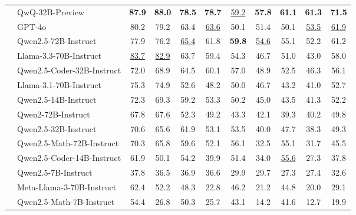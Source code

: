 \begin{table*}[h]
{\begin{tabular}{clccccccccc}
\hline

& QwQ-32B-Preview & \textbf{87.9} & \textbf{88.0} & \textbf{78.5} & \textbf{78.7} & \underline{59.2} & \textbf{57.8} &\textbf{61.1} & \textbf{61.3} & \textbf{71.5} \\
 & GPT-4o& 80.2 & 79.2& 63.4 &\underline{63.6} & 50.1&51.4& 50.1 & \underline{53.5} & \underline{61.9} \\
 & Qwen2.5-72B-Instruct & 77.9 & 76.2 & \underline{65.4} & 61.8 & \textbf{59.8} & \underline{54.6} & 55.1 & 52.2 &  61.2 \\

 & Llama-3.3-70B-Instruct & \underline{83.7} & \underline{82.9} & 63.7 & 59.4 & 54.3 & 46.7 & 51.0 & 43.0 & 58.0 \\
 & Qwen2.5-Coder-32B-Instruct & 72.0 & 68.9 & 64.5 & 60.1 & 57.0 & 48.9 & 52.5 & 46.3 & 56.1 \\
 & Llama-3.1-70B-Instruct & 75.3 & 74.9 & 52.6 & 48.2 & 50.0 & 46.7 & 43.2 & 41.0 & 52.7 \\
 & Qwen2.5-14B-Instruct & 72.3 & 69.3 & 59.2 & 53.3 & 50.2 & 45.0 & 43.5 & 41.3 & 52.2 \\
 & Qwen2-72B-Instruct & 67.8 & 67.6 & 52.3 & 49.2 & 43.3 & 42.1 & 39.3 & 40.2 & 49.8 \\
 & Qwen2.5-32B-Instruct & 70.6 & 65.6 & 61.9 & 53.1 & 53.5 & 40.0 & 47.7 & 38.3 & 49.3 \\
 & Qwen2.5-Math-72B-Instruct & 70.3 & 65.8 & 59.6 & 52.1 & 56.1 & 32.5 & 55.1 & 31.7 & 45.5 \\
 & Qwen2.5-Coder-14B-Instruct & 61.9 & 50.1 & 54.2 & 39.9 & 51.4 & 34.0 & \underline{55.6} & 27.3 & 37.8 \\
 & Qwen2.5-7B-Instruct & 37.8 & 36.5 & 36.9 & 36.6 & 29.9 & 29.7 & 27.3 & 27.4 & 32.6 \\
 & Meta-Llama-3-70B-Instruct & 62.4 & 52.2 & 48.3 & 22.8 & 46.2 & 21.2 & 44.8 & 20.0 & 29.1 \\
 & Qwen2.5-Math-7B-Instruct & 54.4 & 26.8 & 50.3 & 25.7 & 43.1 & 14.2 & 41.6 & 12.7 & 19.9 \\

\end{tabular}}
\end{table*}
